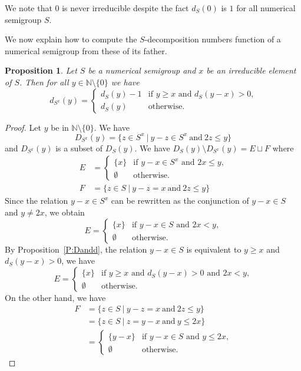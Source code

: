 \documentclass[reqno,11pt]{amsart}
\theoremstyle{plain}
\newtheorem{prop}{Proposition}[section]
\theoremstyle{definition}
\renewcommand{\leq}{\leqslant}
\renewcommand{\geq}{\geqslant}
\newcommand{\NN}{\mathbb{N}}
\begin{document}
We note  that $0$ is never irreducible despite the fact $d_S(0)$ is $1$ for all numerical semigroup $S$.

We now explain how to compute the $S$-decomposition numbers function of a numerical semigroup  from these of its father.

\begin{prop}
Let $S$ be a numerical semigroup and $x$ be an irreducible element of $S$. 
Then for all $y\in \NN\setminus\{0\}$ we have
\[
d_{S^x}(y)=\begin{cases}
d_S(y)-1&\text{if $y\geq x$ and $d_S(y-x)>0$,}\\
d_S(y) &\text{otherwise.}
\end{cases}
\] 
\end{prop}


\begin{proof}
Let $y$ be in $\NN\setminus\{0\}$. We have 
\[
D_{S^x}(y)=\{z \in S^x\ |\ y-z\in S^x\ \text{and}\  2z\leq y\}
\]
and $D_{S^x}(y)$ is a subset of $D_S(y)$.
We have $D_S(y)\setminus D_{S^x}(y)=E\sqcup F$ where
\begin{align*}
E&=\begin{cases}
\{x\} &\text{if $y-x\in S^x$ and $2x\leq y$,}\\
\emptyset & \text{otherwise.}
\end{cases}\\
F&=\{z\in S\ |\ y-z=x\ \text{and}\ 2z\leq y\}
\end{align*}
Since  the relation $y-x\in S^x$ can be rewritten as the conjunction of $y-x\in S$ and $y\not=2x$, we obtain
\[
E=\begin{cases}
\{x\} &\text{if $y-x\in S$ and $2x< y$,}\\
\emptyset & \text{otherwise.}
\end{cases}
\]
By Proposition~\ref{P:Dandd}, the relation $y-x\in S$ is equivalent to $y\geq x$ and $d_S(y-x)>0$, we have
\[
E=\begin{cases}
\{x\} &\text{if $y\geq x$ and $d_S(y-x)>0$ and $2x< y$,}\\
\emptyset & \text{otherwise.}
\end{cases}
\]
On the other hand, we have 
\begin{align*}
F&=\{z\in S\ |\ y-z=x\ \text{and}\ 2z\leq y\}\\
&=\{z\in S\ |\ z=y-x\ \text{and}\ y\leq 2x\}\\
&=\begin{cases}
\{y-x\} & \text{if $y-x\in S$ and $y\leq 2x$,}\\
\emptyset & \text{otherwise.}

\end{cases}
\end{align*}
\end{proof}
\end{document}
